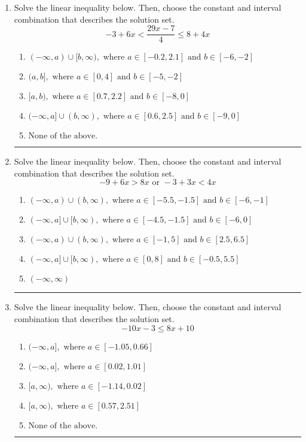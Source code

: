 \documentclass[14pt]{extbook}
\newcommand{\litem}[1]{\item#1\hspace*{-1cm}\rule{\textwidth}{0.4pt}}
\begin{document}
\begin{enumerate}
{\begin{enumerate}[label=\Alph*.]
\end{enumerate} }
\litem{
Solve the linear inequality below. Then, choose the constant and interval combination that describes the solution set.\[ -3 + 6 x < \frac{29 x - 7}{4} \leq 8 + 4 x \]\begin{enumerate}[label=\Alph*.]
\item \( (-\infty, a) \cup [b, \infty), \text{ where } a \in [-0.2, 2.1] \text{ and } b \in [-6, -2] \)
\item \( (a, b], \text{ where } a \in [0, 4] \text{ and } b \in [-5, -2] \)
\item \( [a, b), \text{ where } a \in [0.7, 2.2] \text{ and } b \in [-8, 0] \)
\item \( (-\infty, a] \cup (b, \infty), \text{ where } a \in [0.6, 2.5] \text{ and } b \in [-9, 0] \)
\item \( \text{None of the above.} \)

\end{enumerate} }
\litem{
Solve the linear inequality below. Then, choose the constant and interval combination that describes the solution set.\[ -9 + 6 x > 8 x \text{ or } -3 + 3 x < 4 x \]\begin{enumerate}[label=\Alph*.]
\item \( (-\infty, a) \cup (b, \infty), \text{ where } a \in [-5.5, -1.5] \text{ and } b \in [-6, -1] \)
\item \( (-\infty, a] \cup [b, \infty), \text{ where } a \in [-4.5, -1.5] \text{ and } b \in [-6, 0] \)
\item \( (-\infty, a) \cup (b, \infty), \text{ where } a \in [-1, 5] \text{ and } b \in [2.5, 6.5] \)
\item \( (-\infty, a] \cup [b, \infty), \text{ where } a \in [0, 8] \text{ and } b \in [-0.5, 5.5] \)
\item \( (-\infty, \infty) \)

\end{enumerate} }
\litem{
Solve the linear inequality below. Then, choose the constant and interval combination that describes the solution set.\[ -10x -3 \leq 8x + 10 \]\begin{enumerate}[label=\Alph*.]
\item \( (-\infty, a], \text{ where } a \in [-1.05, 0.66] \)
\item \( (-\infty, a], \text{ where } a \in [0.02, 1.01] \)
\item \( [a, \infty), \text{ where } a \in [-1.14, 0.02] \)
\item \( [a, \infty), \text{ where } a \in [0.57, 2.51] \)
\item \( \text{None of the above}. \)


\end{enumerate}}
\end{enumerate}
\end{document}
